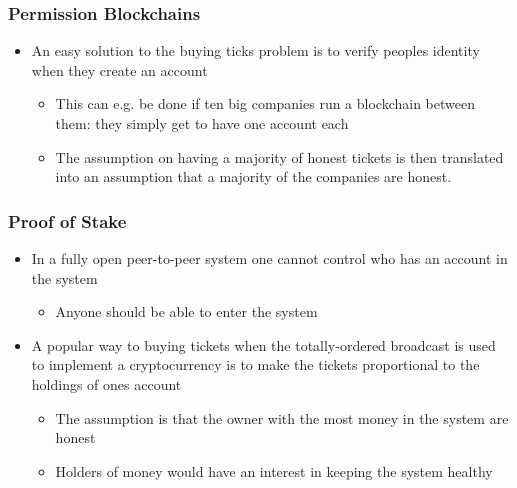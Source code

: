 \documentclass[11pt]{article}
\begin{document}
\subsubsection{Permission Blockchains}
\label{sec:org117b257}
\begin{itemize}
\item An easy solution to the buying ticks problem is to verify peoples identity when they create an account
\begin{itemize}
\item This can e.g. be done if ten big companies run a blockchain between them: they simply get to have one account each
\item The assumption on having a majority of honest tickets is then translated into an assumption that a majority of the companies are honest.
\end{itemize}
\end{itemize}

\subsubsection{Proof of Stake}
\label{sec:org57bdca8}
\begin{itemize}
\item In a fully open peer-to-peer system one cannot control who has an account in the system
\begin{itemize}
\item Anyone should be able to enter the system
\end{itemize}

\item A popular way to buying tickets when the totally-ordered broadcast is used to implement a cryptocurrency is to make the tickets proportional to the holdings of ones account
\begin{itemize}
\item The assumption is that the owner with the most money in the system are honest
\item Holders of money would have an interest in keeping the system healthy
\end{itemize}
\end{itemize}
\end{document}
